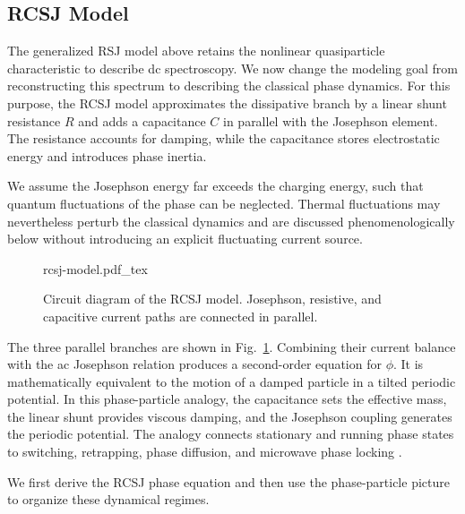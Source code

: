     \subsection{RCSJ Model}
    \label{subsec:macro:rcsj}

        The generalized RSJ model above retains the nonlinear quasiparticle characteristic to describe dc spectroscopy. We now change the modeling goal from reconstructing this spectrum to describing the classical phase dynamics. For this purpose, the RCSJ model approximates the dissipative branch by a linear shunt resistance $R$ and adds a capacitance $C$ in parallel with the Josephson element. The resistance accounts for damping, while the capacitance stores electrostatic energy and introduces phase inertia.

        We assume the Josephson energy far exceeds the charging energy, such that quantum fluctuations of the phase can be neglected. Thermal fluctuations may nevertheless perturb the classical dynamics and are discussed phenomenologically below without introducing an explicit fluctuating current source.

        \begin{figure}
            \captionsetup{format=plain}%
            \centering
            \vspace{-.75em}
            {rcsj-model.pdf_tex}
            \caption{
                Circuit diagram of the RCSJ model. Josephson, resistive, and capacitive current paths are connected in parallel.
            }
            \label{fig:macro:rcsj}
        \end{figure}
        The three parallel branches are shown in Fig.~\ref{fig:macro:rcsj}. Combining their current balance with the ac Josephson relation produces a second-order equation for $\phi$. It is mathematically equivalent to the motion of a damped particle in a tilted periodic potential. In this phase-particle analogy, the capacitance sets the effective mass, the linear shunt provides viscous damping, and the Josephson coupling generates the periodic potential. The analogy connects stationary and running phase states to switching, retrapping, phase diffusion, and microwave phase locking \cite{stewart_currentvoltage_1968,mccumber_effect_1968}.

        We first derive the RCSJ phase equation and then use the phase-particle picture to organize these dynamical regimes.

